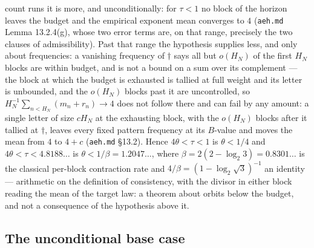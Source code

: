 \documentclass[11pt]{article}
\theoremstyle{remark}
\newcommand{\LL}{\log_2 3}
\begin{document}
count runs it is more, and unconditionally: for $\tau < 1$ no block of the horizon
leaves the budget and the empirical exponent mean converges to $4$
(\texttt{aeh.md} Lemma 13.2.4(g), whose two error terms are, on that range,
precisely the two clauses of admissibility). Past that range the hypothesis
supplies less, and only about frequencies: a vanishing frequency of $\dagger$ says
all but $o(H_N)$ of the first $H_N$ blocks are within budget, and is not a bound on
a sum over its complement --- the block at which the budget is exhausted is tallied
at full weight and its letter is unbounded, and the $o(H_N)$ blocks past it are
uncontrolled, so $H_N^{-1}\sum_{n<H_N}(m_n+r_n) \to 4$ does not follow there and
can fail by any amount: a single letter of size $cH_N$ at the exhausting block, with
the $o(H_N)$ blocks after it tallied at $\dagger$, leaves every fixed pattern
frequency at its $B$-value and moves the mean from $4$ to $4 + c$ (\texttt{aeh.md}
\S13.2). Hence $4\theta < \tau < 1$ is $\theta < 1/4$ and
$4\theta < \tau < 4.8188\ldots$ is $\theta < 1/\beta = 1.2047\ldots$, where
$\beta = 2(2-\LL) = 0.8301\ldots$ is the classical per-block contraction rate and
$4/\beta = (1-\log_2\sqrt3)^{-1}$ an identity --- arithmetic on the definition of
consistency, with the divisor in either block reading the mean of the target law:
a theorem about orbits below the budget, and not a consequence of the hypothesis
above it.

\subsection*{The unconditional base case}
\end{document}
